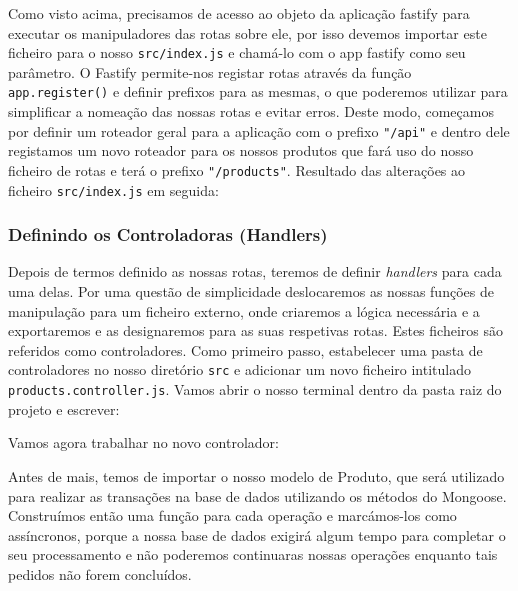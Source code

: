 Como visto acima, precisamos de acesso ao objeto da aplicação fastify para executar os manipuladores das rotas sobre ele, por isso devemos importar este ficheiro para o nosso \texttt{src/index.js} e chamá-lo com o app fastify como seu parâmetro. O Fastify permite-nos registar rotas através da função \texttt{app.register()} e definir prefixos para as mesmas, o que poderemos utilizar para simplificar a nomeação das nossas rotas e evitar erros. Deste modo, começamos por definir um roteador geral para a aplicação com o prefixo \texttt{"/api"} e dentro dele registamos um novo roteador para os nossos produtos que fará uso do nosso ficheiro de rotas e terá o prefixo \texttt{"/products"}. Resultado das alterações ao ficheiro \texttt{src/index.js} em seguida:



\subsubsection{Definindo os Controladoras (Handlers)}

Depois de termos definido as nossas rotas, teremos de definir \textit{handlers} para cada uma delas. Por uma questão de simplicidade deslocaremos as nossas funções de manipulação para um ficheiro externo, onde criaremos a lógica necessária e a exportaremos e as designaremos para as suas respetivas rotas. Estes ficheiros são referidos como controladores. Como primeiro passo, estabelecer uma pasta de controladores no nosso diretório \texttt{src} e adicionar um novo ficheiro intitulado \texttt{products.controller.js}. Vamos abrir o nosso terminal dentro da pasta raiz do projeto e escrever:



Vamos agora trabalhar no novo controlador:



Antes de mais, temos de importar o nosso modelo de Produto, que será utilizado para realizar as transações na base de dados utilizando os métodos do Mongoose. Construímos então uma função para cada operação e marcámos-los como assíncronos, porque a nossa base de dados exigirá algum tempo para completar o seu processamento e não poderemos continuaras nossas operações enquanto tais pedidos não forem concluídos.

